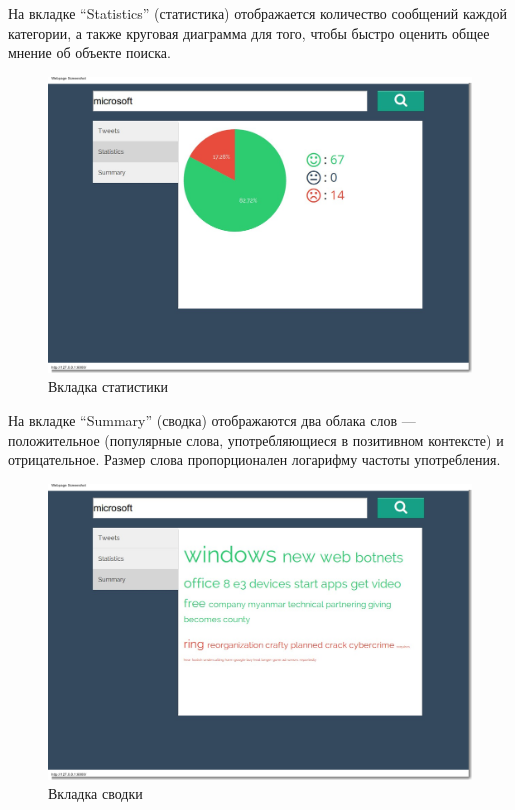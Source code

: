 На вкладке ``Statistics'' (статистика) отображается количество сообщений каждой категории,
а также круговая диаграмма для того, чтобы быстро оценить общее мнение
об объекте поиска.
\begin{figure}[!ht]
\begin{center}
\includegraphics[scale=0.4, trim=20mm 60mm 20mm 10mm, clip]{../resources/screens/statistics.png}
\caption{Вкладка статистики}
\label{gr:stats}
\end{center}
\end{figure} 


На вкладке ``Summary'' (сводка) отображаются два облака слов --- положительное 
(популярные слова, употребляющиеся в позитивном контексте) и отрицательное.
Размер слова пропорционален логарифму частоты употребления.
\begin{figure}[!ht]
\begin{center}
\includegraphics[scale=0.4, trim=20mm 60mm 20mm 10mm, clip]{../resources/screens/summary.png}
\caption{Вкладка сводки}
\label{gr:summary}
\end{center}
\end{figure} 

\clearpage{}